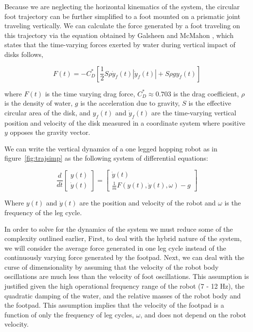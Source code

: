 Because we are neglecting the horizontal kinematics of the system, the circular foot trajectory can be further simplified to a foot mounted on a prismatic joint traveling vertically. We can calculate the force generated by a foot traveling on this trajectory via the equation obtained by Galsheen and McMahon \cite{glasheen1996vertical}, which states that the time-varying forces exerted by water during vertical impact of disks follows,

\begin{equation}
	F(t) = - C_D^* \left[\frac{1}{2} S \rho \dot{y}_f(t) |\dot{y}_f(t) | + S \rho g y_f(t) \right]
	\label{eq:force_t}
\end{equation}

\noindent where $F(t)$ is the time varying drag force, $C_D^* \approx 0.703$ is the drag coefficient, $\rho$ is the density of water, $g$ is the acceleration due to gravity, $S$ is the effective circular area of the disk, and $y_f(t)$ and $\dot{y}_f(t)$ are the time-varying vertical position and velocity of the disk measured in a coordinate system where positive $y$ opposes the gravity vector. 

We can write the vertical dynamics of a one legged hopping robot as in figure~\ref{fig:trajsimp} as the following system of differential equations:

\begin{equation}
	\frac{d}{dt} \begin{bmatrix} y(t) \\ \dot{y}(t) \end{bmatrix} = \begin{bmatrix} \dot{y}(t) \\ \frac{1}{m} F(y(t),\dot{y}(t), \omega) - g \end{bmatrix} 
    \label{eq:eom}
\end{equation}

\noindent Where $y(t)$ and $\dot{y}(t)$ are the position and velocity of the robot and $\omega$ is the frequency of the leg cycle. 

In order to solve for the dynamics of the system we must reduce some of the complexity outlined earlier, First, to deal with the hybrid nature of the system, we will consider the average force generated in one leg cycle instead of the continuously varying force generated by the footpad. Next, we can deal with the curse of dimensionality by assuming that the velocity of the robot body oscillations are much less than the velocity of foot oscillations. This assumption is justified given the high operational frequency range of the robot (7 - 12 Hz), the quadratic damping of the water, and the relative masses of the robot body and the footpad. This assumption implies that the velocity of the footpad is a function of only the frequency of leg cycles, $\omega$, and does not depend on the robot velocity.

